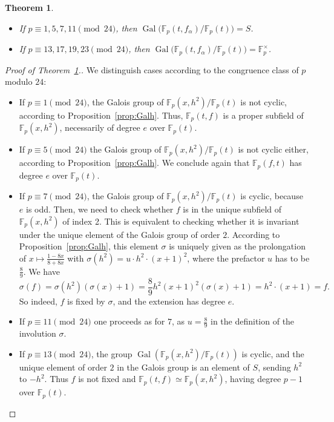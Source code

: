 \documentclass[10pt,a4paper]{amsart}
\newtheorem{thm}{Theorem}
\newcommand{\F}{\mathbb{F}}
\DeclareMathOperator{\Gal}{Gal}
\begin{document}
\begin{thm}~
\label{thm:apery}
\begin{itemize}
\item If $p \equiv 1, 5, 7, 11 \pmod{24}$, then
$\Gal\big(\F_p(t, f_\alpha)/\F_p(t)\big) = S$.

\item If $p \equiv 13, 17, 19, 23 \pmod{24}$, then
$\Gal\big(\F_p(t, f_\alpha)/\F_p(t)\big) = \F_p^\times$.
\end{itemize}
\end{thm}

\begin{proof}[Proof of Theorem~\ref{thm:apery}.]
    We distinguish cases according to the congruence class of $p$ modulo $24$:

    \begin{itemize}
        \item If $p\equiv 1 \pmod{24}$, the Galois group of $\F_p(x, h^2)/\F_p(t)$ is not cyclic, according to Proposition~\ref{prop:Galh}. Thus, $\F_p(t, f)$ is a proper subfield of $\F_p(x, h^2)$, necessarily of degree $e$ over $\F_p(t)$.
        \item If $p\equiv 5 \pmod{24}$ the Galois group of $\F_p(x, h^2)/\F_p(t)$ is not cyclic either, according to Proposition~\ref{prop:Galh}. We conclude again that $\F_p(f,t)$ has degree $e$ over $\F_p(t)$.
        \item If $p\equiv 7 \pmod{24}$, the Galois group of $\F_p(x, h^2)/\F_p(t)$ is cyclic, because $e$ is odd. Then, we need to check whether $f$ is in the unique subfield of $\F_p(x, h^2)$ of index 2. This is equivalent to checking whether it is invariant under the unique element  of the Galois group of order $2$. According to Proposition~\ref{prop:Galh}, this element $\sigma$ is uniquely given as the prolongation of $x\mapsto \frac{1-8x}{8+8x}$ with $\sigma(h^2)=u\cdot h^2\cdot (x+1)^2$, where the prefactor $u$ has to be $\frac89$. We have 
        \[\textstyle \sigma(f)= \sigma(h^2) (\sigma(x)+1) = \frac 8 9 h^2 (x+1)^2 (\sigma(x)+1) = h^2\cdot (x+1) = f.\]
        So indeed, $f$ is fixed by $\sigma$, and the extension has degree $e$.
        \item If $p\equiv 11 \pmod{24}$ one proceeds as for $7$, as $u=\frac 8 9$ in the definition of the involution $\sigma$.     
        \item If $p\equiv 13 \pmod{24}$, the group $\Gal(\F_p(x, h^2)/\F_p(t))$ is cyclic, and the unique element of order $2$ in the Galois group is an element of $S$, sending $h^2$ to $-h^2$. Thus $f$ is not fixed and $\F_p(t, f)\simeq \F_p(x, h^2)$, having degree $p{-}1$ over $\F_p(t)$.

\end{itemize}
\end{proof}
\end{document}
